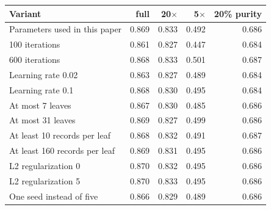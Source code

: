 \begin{tabular}{lrrrr}
\toprule
Variant & full & 20$\times$ & 5$\times$ & 20\% purity \\
\midrule
Parameters used in this paper & 0.869 & 0.833 & 0.492 & 0.686 \\
100 iterations & 0.861 & 0.827 & 0.447 & 0.684 \\
600 iterations & 0.868 & 0.833 & 0.501 & 0.687 \\
Learning rate 0.02 & 0.863 & 0.827 & 0.489 & 0.684 \\
Learning rate 0.1 & 0.868 & 0.830 & 0.495 & 0.684 \\
At most 7 leaves & 0.867 & 0.830 & 0.485 & 0.686 \\
At most 31 leaves & 0.869 & 0.827 & 0.499 & 0.686 \\
At least 10 records per leaf & 0.868 & 0.832 & 0.491 & 0.687 \\
At least 160 records per leaf & 0.869 & 0.831 & 0.495 & 0.686 \\
L2 regularization 0 & 0.870 & 0.832 & 0.495 & 0.686 \\
L2 regularization 5 & 0.870 & 0.833 & 0.495 & 0.686 \\
One seed instead of five & 0.866 & 0.829 & 0.489 & 0.686 \\
\bottomrule
\end{tabular}
